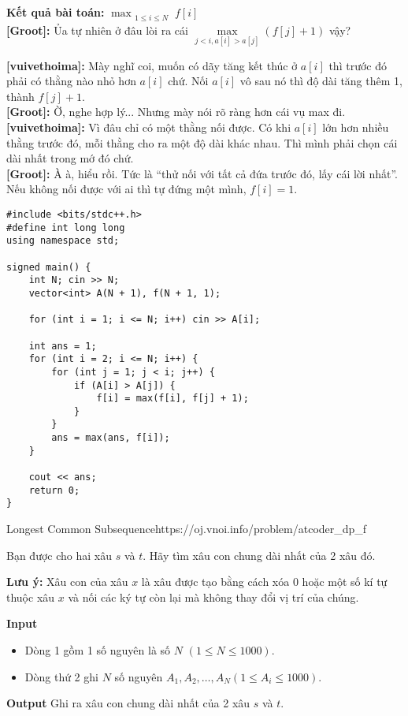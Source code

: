 \textbf{Kết quả bài toán:} $\max_{\substack{1 \leq i \leq N}} f[i]$\\

\textbf{[Groot]:} Ủa tự nhiên ở đâu lòi ra cái $\max\limits_{j<i, a[i]>a[j]} (f[j]+1)$ vậy? 

\textbf{[vuivethoima]:} Mày nghĩ coi, muốn có dãy tăng kết thúc ở $a[i]$ thì trước đó phải có thằng nào nhỏ hơn $a[i]$ chứ. 
Nối $a[i]$ vô sau nó thì độ dài tăng thêm 1, thành $f[j]+1$.\\

\textbf{[Groot]:} Ờ, nghe hợp lý... Nhưng mày nói rõ ràng hơn cái vụ max đi.\\

\textbf{[vuivethoima]:} Vì đâu chỉ có một thằng nối được. 
Có khi $a[i]$ lớn hơn nhiều thằng trước đó, mỗi thằng cho ra một độ dài khác nhau. 
Thì mình phải chọn cái dài nhất trong mớ đó chứ.\\

\textbf{[Groot]:} À à, hiểu rồi. Tức là “thử nối với tất cả đứa trước đó, lấy cái lời nhất”. 
Nếu không nối được với ai thì tự đứng một mình, $f[i]=1$.\\

\begin{lstlisting}[title=\centering \textbf{Cài đặt}]
#include <bits/stdc++.h>
#define int long long
using namespace std;

signed main() {
    int N; cin >> N;
    vector<int> A(N + 1), f(N + 1, 1);

    for (int i = 1; i <= N; i++) cin >> A[i];

    int ans = 1;
    for (int i = 2; i <= N; i++) {
        for (int j = 1; j < i; j++) {
            if (A[i] > A[j]) {
                f[i] = max(f[i], f[j] + 1);
            }
        }
        ans = max(ans, f[i]);
    }

    cout << ans;
    return 0;
}
\end{lstlisting}


\begin{baitap}{Longest Common Subsequence}{https://oj.vnoi.info/problem/atcoder\_dp\_f}

Bạn được cho hai xâu $s$ và $t$. Hãy tìm xâu con chung dài nhất của 2 xâu đó.

\textbf{Lưu ý: }Xâu con của xâu $x$ là xâu được tạo bằng cách xóa $0$ hoặc một số kí tự thuộc xâu $x$ và nối các ký tự còn lại mà không thay đổi vị trí của chúng.

\textbf{Input}
\begin{itemize}[noitemsep]
  \item Dòng 1 gồm 1 số nguyên là số $N$ $(1 \leq N \leq 1000)$.
  \item Dòng thứ 2 ghi $N$ số nguyên $A_1, A_2, \dots, A_N (1 \leq A_i \leq 1000)$.
\end{itemize}

\textbf{Output}
Ghi ra xâu con chung dài nhất của 2 xâu $s$ và $t$.

\end{baitap}

